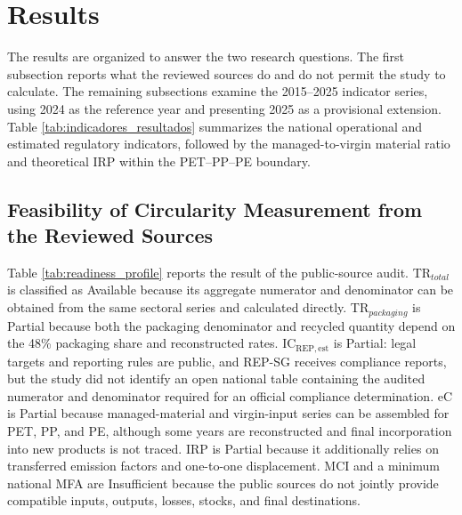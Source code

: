 \documentclass[review,10pt]{elsarticle}
\newcommand{\revpar}[1]{#1\par\medskip}
\newcommand{\changepar}[1]{#1\par\medskip}
\begin{document}
\section{Results}

\revpar{The results are organized to answer the two research questions. The first subsection reports what the reviewed sources do and do not permit the study to calculate. The remaining subsections examine the 2015--2025 indicator series, using 2024 as the reference year and presenting 2025 as a provisional extension. Table \ref{tab:indicadores_resultados} summarizes the national operational and estimated regulatory indicators, followed by the managed-to-virgin material ratio and theoretical IRP within the PET--PP--PE boundary.}

\subsection{Feasibility of Circularity Measurement from the Reviewed Sources}

\changepar{Table \ref{tab:readiness_profile} reports the result of the public-source audit. TR$_{total}$ is classified as Available because its aggregate numerator and denominator can be obtained from the same sectoral series and calculated directly. TR$_{packaging}$ is Partial because both the packaging denominator and recycled quantity depend on the 48\% packaging share and reconstructed rates. IC$_{\mathrm{REP,est}}$ is Partial: legal targets and reporting rules are public, and REP-SG receives compliance reports, but the study did not identify an open national table containing the audited numerator and denominator required for an official compliance determination. eC is Partial because managed-material and virgin-input series can be assembled for PET, PP, and PE, although some years are reconstructed and final incorporation into new products is not traced. IRP is Partial because it additionally relies on transferred emission factors and one-to-one displacement. MCI and a minimum national MFA are Insufficient because the public sources do not jointly provide compatible inputs, outputs, losses, stocks, and final destinations.}
\end{document}
